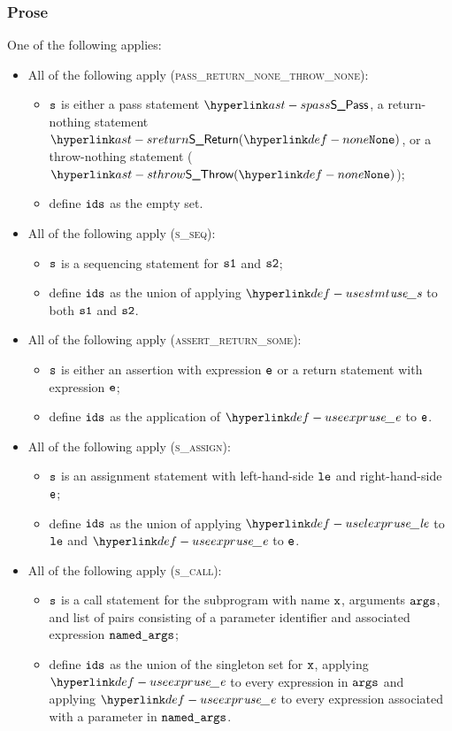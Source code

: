\subsubsection{Prose}
One of the following applies:
\begin{itemize}
  \item All of the following apply (\textsc{pass\_return\_none\_throw\_none}):
  \begin{itemize}
    \item $\texttt{s}$ is either a pass statement $\SPass$, a return-nothing statement $\SReturn(\None)$,
          or a throw-nothing statement ($\SThrow(\None)$);
    \item define $\texttt{ids}$ as the empty set.
  \end{itemize}

  \item All of the following apply (\textsc{s\_seq}):
  \begin{itemize}
    \item $\texttt{s}$ is a sequencing statement for $\texttt{s1}$ and $\texttt{s2}$;
    \item define $\texttt{ids}$ as the union of applying $\usestmt$ to both $\texttt{s1}$ and $\texttt{s2}$.
  \end{itemize}

  \item All of the following apply (\textsc{assert\_return\_some}):
  \begin{itemize}
    \item $\texttt{s}$ is either an assertion with expression $\texttt{e}$ or a return statement with expression $\texttt{e}$;
    \item define $\texttt{ids}$ as the application of $\useexpr$ to $\texttt{e}$.
  \end{itemize}

  \item All of the following apply (\textsc{s\_assign}):
  \begin{itemize}
    \item $\texttt{s}$ is an assignment statement with left-hand-side $\texttt{le}$ and right-hand-side $\texttt{e}$;
    \item define $\texttt{ids}$ as the union of applying $\uselexpr$ to $\texttt{le}$ and $\useexpr$ to $\texttt{e}$.
  \end{itemize}

  \item All of the following apply (\textsc{s\_call}):
  \begin{itemize}
    \item $\texttt{s}$ is a call statement for the subprogram with name $\texttt{x}$, arguments $\texttt{args}$, and list of
          pairs consisting of a parameter identifier and associated expression $\texttt{named\_args}$;
    \item define $\texttt{ids}$ as the union of the singleton set for $\texttt{x}$, applying $\useexpr$ to
          every expression in $\texttt{args}$ and applying $\useexpr$ to every expression associated with
          a parameter in $\texttt{named\_args}$.
  \end{itemize}


\end{itemize}

